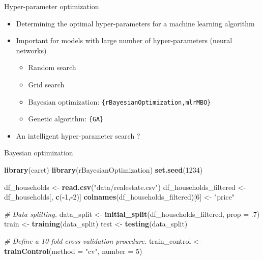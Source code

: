 \documentclass[12pt,ignorenonframetext,]{beamer}
\newenvironment{Shaded}{\begin{snugshade}}{\end{snugshade}}
\newcommand{\CommentTok}[1]{\textcolor[rgb]{0.56,0.35,0.01}{\textit{#1}}}
\newcommand{\DataTypeTok}[1]{\textcolor[rgb]{0.13,0.29,0.53}{#1}}
\newcommand{\DecValTok}[1]{\textcolor[rgb]{0.00,0.00,0.81}{#1}}
\newcommand{\FloatTok}[1]{\textcolor[rgb]{0.00,0.00,0.81}{#1}}
\newcommand{\KeywordTok}[1]{\textcolor[rgb]{0.13,0.29,0.53}{\textbf{#1}}}
\newcommand{\NormalTok}[1]{#1}
\newcommand{\OperatorTok}[1]{\textcolor[rgb]{0.81,0.36,0.00}{\textbf{#1}}}
\newcommand{\StringTok}[1]{\textcolor[rgb]{0.31,0.60,0.02}{#1}}
\providecommand{\tightlist}{%
  \setlength{\itemsep}{0pt}\setlength{\parskip}{0pt}}
\begin{document}
\begin{frame}{Hyper-parameter optimization}
\protect\hypertarget{hyper-parameter-optimization}{}

\begin{itemize}
\tightlist
\item
  Determining the optimal hyper-parameters for a machine learning
  algorithm \vspace{2mm}
\item
  Important for models with large number of hyper-parameters (neural
  networks)

  \begin{itemize}
      \item Random search
      \item Grid search
      \item Bayesian optimization: \texttt{\{rBayesianOptimization,mlrMBO\}}
      \item Genetic algorithm: \texttt{\{GA\}}
    \end{itemize}
   \vspace{2mm}
\item
  An intelligent hyper-parameter search ?
\end{itemize}

\end{frame}

\begin{frame}[fragile]{Bayesian optimization}
\protect\hypertarget{bayesian-optimization}{}

\tiny

\begin{Shaded}
\begin{Highlighting}[]
\KeywordTok{library}\NormalTok{(caret)}
\KeywordTok{library}\NormalTok{(rBayesianOptimization)}
\KeywordTok{set.seed}\NormalTok{(}\DecValTok{1234}\NormalTok{)}

\NormalTok{df_households <-}\StringTok{ }\KeywordTok{read.csv}\NormalTok{(}\StringTok{"data/realestate.csv"}\NormalTok{)}
\NormalTok{df_households_filtered <-}\StringTok{ }\NormalTok{df_households[, }\KeywordTok{c}\NormalTok{(}\OperatorTok{-}\DecValTok{1}\NormalTok{,}\OperatorTok{-}\DecValTok{2}\NormalTok{)]}
\KeywordTok{colnames}\NormalTok{(df_households_filtered)[}\DecValTok{6}\NormalTok{] <-}\StringTok{ "price"}

\CommentTok{# Data splitting.}
\NormalTok{data_split <-}\StringTok{ }\KeywordTok{initial_split}\NormalTok{(df_households_filtered, }\DataTypeTok{prop =} \FloatTok{.7}\NormalTok{)}
\NormalTok{train <-}\StringTok{ }\KeywordTok{training}\NormalTok{(data_split)}
\NormalTok{test  <-}\StringTok{ }\KeywordTok{testing}\NormalTok{(data_split)}

\CommentTok{# Define a 10-fold cross validation procedure.}
\NormalTok{train_control <-}\StringTok{ }\KeywordTok{trainControl}\NormalTok{(}\DataTypeTok{method =} \StringTok{"cv"}\NormalTok{, }\DataTypeTok{number =} \DecValTok{5}\NormalTok{)}
\end{Highlighting}
\end{Shaded}

\normalsize

\end{frame}
\end{document}
